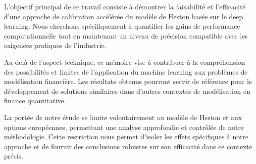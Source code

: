 L'objectif principal de ce travail consiste à démontrer la faisabilité et l'efficacité d'une approche de calibration accélérée du modèle de Heston basée sur le deep learning. Nous cherchons spécifiquement à quantifier les gains de performance computationnelle tout en maintenant un niveau de précision compatible avec les exigences pratiques de l'industrie.

Au-delà de l'aspect technique, ce mémoire vise à contribuer à la compréhension des possibilités et limites de l'application du machine learning aux problèmes de modélisation financière. Les résultats obtenus pourront servir de référence pour le développement de solutions similaires dans d'autres contextes de modélisation en finance quantitative.

La portée de notre étude se limite volontairement au modèle de Heston et aux options européennes, permettant une analyse approfondie et contrôlée de notre méthodologie. Cette restriction nous permet d'isoler les effets spécifiques à notre approche et de fournir des conclusions robustes sur son efficacité dans ce contexte précis.
